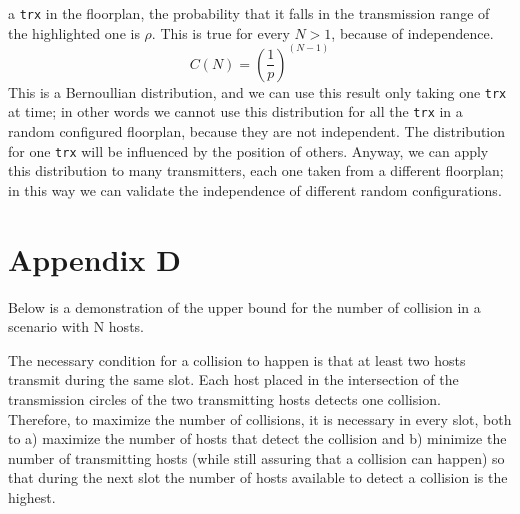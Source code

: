 a \texttt{trx} in the floorplan, the probability that it falls in the
transmission range of the highlighted one is $\rho$. This is true for every
$N > 1$, because of independence.
\begin{equation*}
    C(N)= \left(\frac{1}{p}\right)^{\left( N-1 \right)}
\end{equation*}
This is a Bernoullian distribution, and we can use this result only taking one
\texttt{trx} at time; in other words we cannot use this distribution for all the
\texttt{trx} in a random configured floorplan, because they are not independent. 
The distribution for one \texttt{trx} will be influenced by the position of
others. Anyway, we can apply this distribution to many transmitters, each one
taken from a different floorplan; in this way we can validate the independence
of different random configurations.

\section{Appendix D}
\label{app:d}
Below is a demonstration of the upper bound for the number of collision in a scenario with N hosts.

\hfill \break
The necessary condition for a collision to happen is that at least two hosts transmit during the same slot. Each host placed in the intersection of the transmission circles of the two transmitting hosts detects one collision. \\
Therefore, to maximize the number of collisions, it is necessary in every slot, both to a) maximize the number of hosts that detect the collision and b) minimize the number of transmitting hosts (while still assuring that a collision can happen) so that during the next slot the number of hosts available to detect a collision is the highest.

